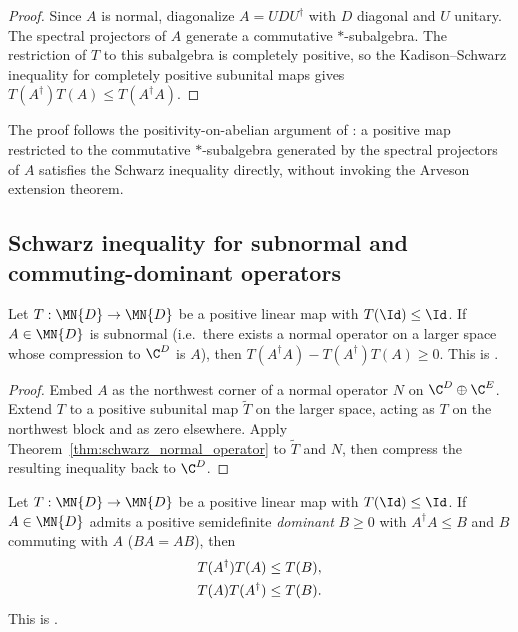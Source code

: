 \begin{proof}
    \leanok
    Since $A$ is normal, diagonalize $A=UDU^\dagger$ with $D$ diagonal and
    $U$ unitary. The spectral projectors of $A$ generate a commutative
    $*$-subalgebra. The restriction of $T$ to this subalgebra is completely
    positive, so the Kadison--Schwarz inequality for completely positive
    subunital maps gives $T(A^\dagger)T(A)\le T(A^\dagger A)$.
\end{proof}

\begin{remark}
    The proof follows the positivity-on-abelian argument of
    \cite[Proposition~1.6]{Wolf2012Quantum}: a positive map restricted to the
    commutative $*$-subalgebra generated by the spectral projectors of $A$
    satisfies the Schwarz inequality directly, without invoking the
    Arveson extension theorem.
\end{remark}

\subsection{Schwarz inequality for subnormal and commuting-dominant operators}

\begin{theorem}\label{thm:schwarz_subnormal}
    \leanok
    Let $T:\MN{D}\to\MN{D}$ be a positive linear map with
    $T(\Id)\le\Id$. If $A\in\MN{D}$ is subnormal (i.e.\ there exists a
    normal operator on a larger space whose compression to $\C^D$ is $A$),
    then $T(A^\dagger A)-T(A^\dagger)T(A)\ge0$.
    This is \cite[Theorem~5.5]{Wolf2012Quantum}.
\end{theorem}

\begin{proof}
    \leanok
    Embed $A$ as the northwest corner of a normal operator $N$ on
    $\C^D\oplus\C^E$. Extend $T$ to a positive subunital map $\widetilde{T}$
    on the larger space, acting as $T$ on the northwest block and as zero
    elsewhere. Apply Theorem~\ref{thm:schwarz_normal_operator} to
    $\widetilde{T}$ and $N$, then compress the resulting inequality back to
    $\C^D$.
\end{proof}

\begin{theorem}\label{thm:schwarz_commuting_dominant}
    \leanok
    Let $T:\MN{D}\to\MN{D}$ be a positive linear map with
    $T(\Id)\le\Id$. If $A\in\MN{D}$ admits a positive semidefinite
    \emph{dominant} $B\ge0$ with $A^\dagger A\le B$ and $B$ commuting with
    $A$ ($BA=AB$), then
    \begin{align}
        T(A^\dagger)T(A)&\le T(B), \notag\\
        T(A)T(A^\dagger)&\le T(B).
        \notag
    \end{align}
    This is \cite[Theorem~5.6]{Wolf2012Quantum}.
\end{theorem}


